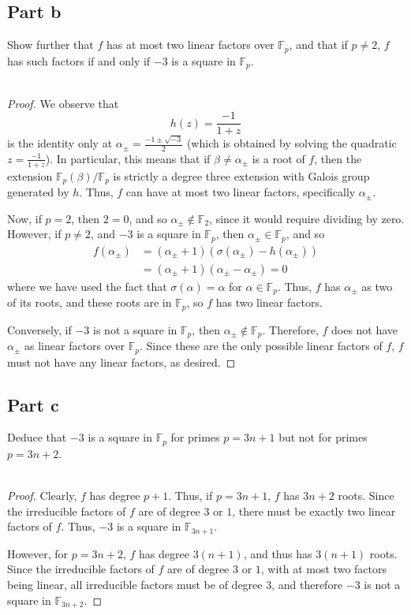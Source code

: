 \documentclass[12pt,reqno]{amsart}
\newcommand{\F}{\mathbb{F}}
\begin{document}
\subsection*{Part b}
Show further that $f$ has at most two linear factors over $\F_p$, and that if
$p\neq 2$, $f$ has such factors if and only if $-3$ is a square in $\F_p$.
\\
\\
\begin{proof}
    We observe that
    \[
        h(z) = \frac{-1}{1+z}
    \]
    is the identity only at $\alpha_{\pm}=\frac{-1\pm\sqrt{-3}}{2}$ (which is
    obtained by solving the quadratic $z=\frac{-1}{1+z}$). In particular, this
    means that if $\beta\neq \alpha_{\pm}$ is a root of $f$, then the extension
    $\F_p(\beta)/{\F_p}$ is strictly a degree three extension with Galois group
    generated by $h$. Thus, $f$ can have at most two linear factors,
    specifically $\alpha_{\pm}$.

    Now, if $p=2$, then $2=0$, and so $\alpha_{\pm}\not\in \F_2$, since it would
    require dividing by zero. However, if $p\neq 2$, and $-3$ is a square in
    $\F_p$, then $\alpha_{\pm}\in\F_p$, and so
    \[
        \begin{aligned}
        f(\alpha_{\pm}) &= (\alpha_{\pm}+1)(\sigma(\alpha_{\pm}) -
        h(\alpha_{\pm}))\\
        &=(\alpha_{\pm}+1)(\alpha_{\pm} - \alpha_{\pm}) = 0
    \end{aligned}
    \]
    where we have used the fact that $\sigma(\alpha)=\alpha$ for
    $\alpha\in\F_p$. Thus, $f$ has $\alpha_{\pm}$ as two of its roots, and these
    roots are in $\F_p$, so $f$ has two linear factors.

    Conversely, if $-3$ is not a square in $\F_p$, then
    $\alpha_{\pm}\not\in\F_p$. Therefore, $f$ does not have $\alpha_{\pm}$ as
    linear factors over $\F_p$. Since these are the only possible linear factors of $f$, $f$
    must not have any linear factors, as desired.
\end{proof}

\subsection*{Part c}
Deduce that $-3$ is a square in $\F_p$ for primes $p=3n+1$ but not for primes
$p=3n+2$.
\\
\\
\begin{proof}
    Clearly, $f$ has degree $p+1$. Thus, if $p=3n+1$, $f$ has $3n+2$ roots.
    Since the irreducible factors of $f$ are of degree $3$ or $1$, there must be
    exactly two linear factors of $f$. Thus, $-3$ is a square in $\F_{3n+1}$.

    However, for $p=3n+2$, $f$ has degree $3(n+1)$, and thus has $3(n+1)$ roots.
    Since the irreducible factors of $f$ are of degree $3$ or $1$, with at most
    two factors being linear, all irreducible factors must be of degree $3$, and
    therefore $-3$ is not a square in $\F_{3n+2}$.
\end{proof}
\end{document}
